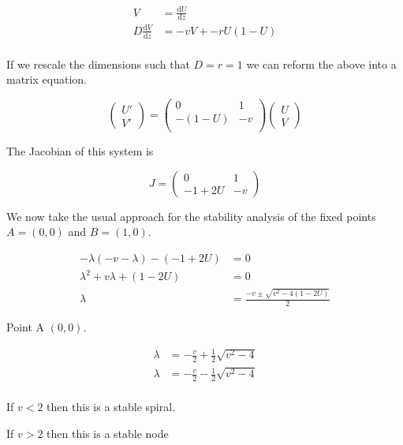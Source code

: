 \documentclass{standalone}
\begin{document}
\begin{align}
V & = \frac{\mathrm{d} U}{\mathrm{d} z} \\
D \frac{\mathrm{d} V}{\mathrm{d} z} & = -v V + -rU(1-U) \\
\end{align}

If we rescale the dimensions such that $D=r=1$ we can reform the above into a matrix equation. 

\begin{equation}
\begin{pmatrix}
U' \\
V'
\end{pmatrix}
= 
\begin{pmatrix}
0 & 1 \\
-(1-U) & -v \\
\end{pmatrix}
\begin{pmatrix}
U \\
V
\end{pmatrix}
\end{equation}

The Jacobian of this system is 

\begin{equation}
J = 
\begin{pmatrix}
0 & 1 \\
-1 + 2U & -v
\end{pmatrix}
\end{equation}

We now take the usual approach for the stability analysis of the fixed points $A = (0,0)$ and $B = (1,0)$. 

\begin{align*}
-\lambda (-v - \lambda ) - (-1 + 2U) & = 0 \\
\lambda ^2 + v \lambda + (1- 2U) & = 0 \\
\lambda & = \frac{-v \pm \sqrt{v^2 - 4 (1-2U) }}{2}
\end{align*}

Point A $(0,0)$.

\begin{align*}
\lambda & = -\frac{v}{2} + \frac{1}{2} \sqrt{v^2 - 4} \\
\lambda & = -\frac{v}{2} - \frac{1}{2} \sqrt{v^2 - 4} \\
\end{align*}

If $v < 2$ then this is a stable spiral. 

If $v > 2$ then this is a stable node 
\end{document}
